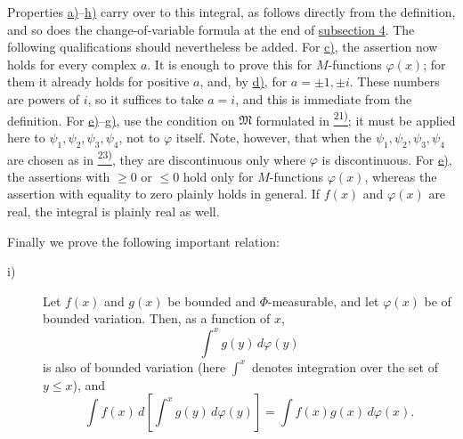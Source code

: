 \documentclass[12pt,b5paper,twoside]{article}
\newcommand{\noteref}[1]{%
  \hyperlink{note:#1}{\textsuperscript{#1)}}}
\begin{document}
Properties \hyperref[prop:I.4.a]{a)}--\hyperref[prop:I.4.h]{h)} carry over to this integral, as follows directly from the definition, and so does the change-of-variable formula at the end of \hyperref[sec:I.4]{subsection 4}. The following qualifications should nevertheless be added. For \hyperref[prop:I.4.c]{c)}, the assertion now holds for every complex $a$. It is enough to prove this for $M$-functions $\varphi(x)$; for them it already holds for positive $a$, and, by \hyperref[prop:I.4.d]{d)}, for $a=\pm1,\pm i$. These numbers are powers of $i$, so it suffices to take $a=i$, and this is immediate from the definition. For \hyperref[prop:I.4.e]{e)}--\hyperref[prop:I.4.g]{g)}, use the condition on $\mathfrak M$ formulated in \noteref{21}; it must be applied here to $\psi_1,\psi_2,\psi_3,\psi_4$, not to $\varphi$ itself. Note, however, that when the $\psi_1,\psi_2,\psi_3,\psi_4$ are chosen as in \noteref{23}, they are discontinuous only where $\varphi$ is discontinuous. For \hyperref[prop:I.4.e]{e)}, the assertions with $\geq0$ or $\leq0$ hold only for $M$-functions $\varphi(x)$, whereas the assertion with equality to zero plainly holds in general. If $f(x)$ and $\varphi(x)$ are real, the integral is plainly real as well.

Finally we prove the following important relation:
\begin{description}
 \item[\textup{i)}]\label{prop:I.5.i}
 Let $f(x)$ and $g(x)$ be bounded and $\Phi$-measurable, and let $\varphi(x)$ be of bounded variation. Then, as a function of $x$,
 \[
  \int^x g(y)\,d\varphi(y)
 \]
 is also of bounded variation (here $\int^x$ denotes integration over the set of $y\leq x$), and
 \label{eq:LS-substitution-nested}
 \begin{equation*}
  \int f(x)\,d\left[\int^x g(y)\,d\varphi(y)\right]
  =\int f(x)g(x)\,d\varphi(x).
 \end{equation*}
\end{description}
\end{document}
